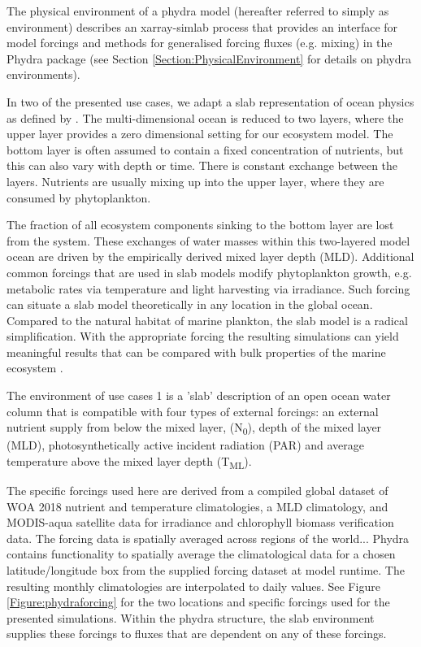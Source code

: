 \documentclass[template.tex]{subfiles}
\begin{document}
The physical environment of a phydra model (hereafter referred to simply as environment) describes an xarray-simlab process that provides an interface for model forcings and methods for generalised forcing fluxes (e.g. mixing) in the Phydra package (see Section \ref{Section:PhysicalEnvironment} for details on phydra environments).

In two of the presented use cases, we adapt a slab representation of ocean physics as defined by \citet{Evans1985ACycles}. The multi-dimensional ocean is reduced to two layers, where the upper layer provides a zero dimensional setting for our ecosystem model. The bottom layer is often assumed to contain a fixed concentration of nutrients, but this can also vary with depth or time. There is constant exchange between the layers. Nutrients are usually mixing up into the upper layer, where they are consumed by phytoplankton. 

The fraction of all ecosystem components sinking to the bottom layer are lost from the system. These exchanges of water masses within this two-layered model ocean are driven by the empirically derived mixed layer depth (MLD). Additional common forcings that are used in slab models modify phytoplankton growth, e.g. metabolic rates via temperature and light harvesting via irradiance. Such forcing can situate a slab model theoretically in any location in the global ocean. Compared to the natural habitat of marine plankton, the slab model is a radical simplification. With the appropriate forcing the resulting simulations can yield meaningful results that can be compared with bulk properties of the marine ecosystem \cite[e.g.][]{Evans1985ACycles, Fasham1990a}.

The environment of use cases 1 is a 'slab' description of an open ocean water column that is compatible with four types of external forcings: an external nutrient supply from below the mixed layer, (\unit{N_0}), depth of the mixed layer (MLD), photosynthetically active incident radiation (PAR) and average temperature above the mixed layer depth (\unit{T_{ML}}).


The specific forcings used here are derived from a compiled global dataset of WOA 2018 nutrient and temperature climatologies, a MLD climatology, and MODIS-aqua satellite data for irradiance and chlorophyll biomass verification data. 
The forcing data is spatially averaged across regions of the world...
Phydra contains functionality to spatially average the climatological data for a chosen latitude/longitude box from the supplied forcing dataset at model runtime. The resulting monthly climatologies are interpolated to daily values. See Figure \ref{Figure:phydraforcing} for the two locations and specific forcings used for the presented simulations. Within the phydra structure, the slab environment supplies these forcings to fluxes that are dependent on any of these forcings.
\end{document}
